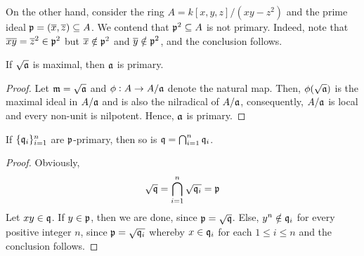 On the other hand, consider the ring $A = k[x,y,z]/(xy - z^2)$ and the prime ideal $\mathfrak p = (\overline x,\overline z)\subseteq A$. We contend that $\mathfrak p^2\subseteq A$ is not primary. Indeed, note that $\overline x\overline y = \overline z^2\in\mathfrak p^2$ but $\overline x\notin\mathfrak p^2$ and $\overline y\notin\mathfrak p^2$, and the conclusion follows.

\begin{proposition}
    If $\sqrt{\mathfrak a}$ is maximal, then $\mathfrak a$ is primary.
\end{proposition}
\begin{proof}
    Let $\mathfrak m = \sqrt{\mathfrak a}$ and $\phi: A\to A/\mathfrak a$ denote the natural map. Then, $\phi(\sqrt{\mathfrak a})$ is the maximal ideal in $A/\mathfrak a$ and is also the nilradical of $A/\mathfrak a$, consequently, $A/\mathfrak a$ is local and every non-unit is nilpotent. Hence, $\mathfrak a$ is primary.
\end{proof}

\begin{lemma}
    If $\{\mathfrak q_i\}_{i = 1}^n$ are $\mathfrak p$-primary, then so is $\mathfrak q=\bigcap_{i = 1}^n\mathfrak q_i$.
\end{lemma}
\begin{proof}
    Obviously, 
    \begin{equation*}
        \sqrt{\mathfrak q} = \bigcap_{i = 1}^n\sqrt{\mathfrak q_i} = \mathfrak p
    \end{equation*}
    Let $xy\in\mathfrak q$. If $y\in\mathfrak p$, then we are done, since $\mathfrak p = \sqrt{\mathfrak q}$. Else, $y^n\notin\mathfrak q_i$ for every positive integer $n$, since $\mathfrak p = \sqrt{\mathfrak q_i}$ whereby $x\in\mathfrak q_i$ for each $1\le i\le n$ and the conclusion follows.
\end{proof}


